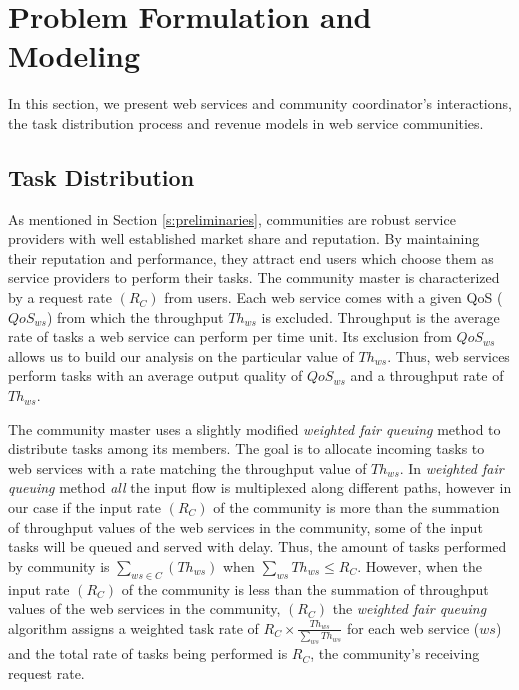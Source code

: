 \section{Problem Formulation and Modeling}\label{s:model}

In this section, we present  web services and community coordinator's interactions, the task distribution process and revenue models in web service communities.

\subsection{Task Distribution}

As mentioned in Section \ref{s:preliminaries}, communities
are robust service providers with well established market share
and reputation. By maintaining their reputation and performance,
they attract  end users which choose them as service providers to
perform their tasks. The community master is characterized by a
request rate $(R_C)$ from users. Each web service comes with a
given QoS ($QoS_{ws}$) from which the throughput $Th_{ws}$ is
excluded. Throughput is the average rate of tasks a web service
can perform per time unit. Its exclusion from $QoS_{ws}$ allows us
to build our analysis on the particular value of $Th_{ws}$. Thus,
web services perform tasks with an average output quality of
$QoS_{ws}$ and a throughput rate of $Th_{ws}$.

The community master uses a slightly modified \emph{weighted fair queuing} method to distribute tasks among its members. The goal is to allocate incoming tasks to web services with a rate matching the throughput value of $Th_{ws}$. In \emph{weighted fair queuing} method \emph{all} the input flow is multiplexed along different paths, however in our case if the input rate $(R_C)$ of the community is more than the summation of throughput values of the web services in the community, some of the input tasks will be queued and served with delay. Thus, the amount of tasks performed by community is $\sum_{ws \in C}{(Th_{ws})}$ when $\sum_{ws}{Th_{ws}} \leq R_{C}$. However, when the input rate $(R_C)$ of the community is less than the summation of throughput values of the web services in the community,
$(R_C)$ the \emph{weighted fair queuing} algorithm assigns a weighted task rate of $R_C \times \frac{Th_{ws}}{\sum_{ws}{Th_{ws}}}$ for each web service ($ws$) and the total rate of tasks being performed is $R_C$, the community's receiving request rate.


